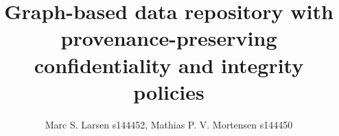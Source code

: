 

\setcounter{secnumdepth}{0}

\title{Graph-based data repository with provenance-preserving confidentiality and integrity policies} 
\author{Marc S. Larsen s144452, Mathias P. V. Mortensen s144450}
\date{\vspace{-5ex}}



\maketitle







